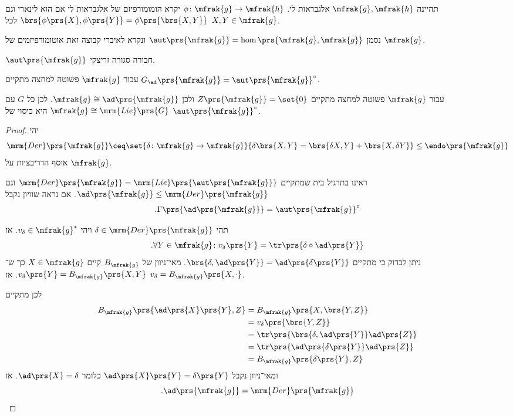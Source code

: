 \documentclass[10pt, twoside]{book}
\newcommand{\Lie}{\mrm{Lie}}
\begin{document}
\begin{definition}
תהיינה
$\mfrak{g}, \mfrak{h}$
אלגבראות לי.
$\phi \colon \mfrak{g} \to \mfrak{h}$
יקרא הומומורפיזם של אלגבראות לי אם הוא לינארי וגם
$\brs{\phi\prs{X}, \phi\prs{Y}} = \phi\prs{\brs{X,Y}}$
לכל
$X,Y \in \mfrak{g}$.
\end{definition}

\begin{notation}
נסמן
$\aut\prs{\mfrak{g}} = \hom\prs{\mfrak{g}, \mfrak{g}}$
ונקרא לאיברי קבוצה זאת אוטומורפיזמים של
$\mfrak{g}$.
\end{notation}

\begin{remark}
$\aut\prs{\mfrak{g}}$
חבורה סגורה זריצקי.
\end{remark}

\begin{proposition}
עבור
$\mfrak{g}$
פשוטה למחצה מתקיים
$G_{\ad}\prs{\mfrak{g}} = \aut\prs{\mfrak{g}}^\circ$.
\end{proposition}

\begin{corollary}
עבור
$\mfrak{g}$
פשוטה למחצה מתקיים
$Z\prs{\mfrak{g}} = \set{0}$
ולכן
$\mfrak{g} \cong \ad\prs{\mfrak{g}}$.
לכן כל
$G$
עם
$\mfrak{g} \cong \Lie\prs{G}$
היא כיסוי של
$\aut\prs{\mfrak{g}}^\circ$.
\end{corollary}

\begin{proof}
יהי
\[\mrm{Der}\prs{\mfrak{g}} \ceq \set{\delta \colon \mfrak{g} \to \mfrak{g}}{\delta\brs{X,Y} = \brs{\delta X, Y} + \brs{X, \delta Y}} \leq \endo\prs{\mfrak{g}}\]
אוסף הדריבציות על
$\mfrak{g}$.

ראינו בתרגיל בית שמתקיים
$\mrm{Der}\prs{\mfrak{g}} = \Lie\prs{\aut\prs{\mfrak{g}}}$
וגם
$\ad\prs{\mfrak{g}} \leq \mrm{Der}\prs{\mfrak{g}}$.
אם נראה שוויון נקבל
\[\text{.} \Gamma\prs{\ad\prs{\mfrak{g}}} = \aut\prs{\mfrak{g}}^\circ\]

תהי
$\delta \in \mrm{Der}\prs{\mfrak{g}}$
ויהי
$v_{\delta} \in \mfrak{g}^*$.
אז
\[\text{.} \forall Y \in \mfrak{g} \colon v_\delta\prs{Y} = \tr\prs{\delta \circ \ad\prs{Y}}\]
ניתן לבדוק כי מתקיים
$\brs{\delta, \ad\prs{Y}} = \ad\prs{\delta\prs{Y}}$.
מאי־ניוון של
$B_{\mfrak{g}}$
קיים
$X \in \mfrak{g}$
כך ש־%
$v_{\delta}\prs{Y} = B_{\mfrak{g}}\prs{X,Y}$.
אז
$v_\delta = B_{\mfrak{g}}\prs{X, \cdot}$.

לכן מתקיים
\begin{align*}
B_{\mfrak{g}}\prs{\ad\prs{X}\prs{Y},Z} &= B_{\mfrak{g}}\prs{X, \brs{Y,Z}}
\\&= v_{\delta} \prs{\brs{Y,Z}}
\\&= \tr\prs{\brs{\delta, \ad\prs{Y}} \ad\prs{Z}}
\\&= \tr\prs{\ad\prs{\delta\prs{Y}} \ad\prs{Z}}
\\&= B_{\mfrak{g}}\prs{\delta\prs{Y}, Z}
\end{align*}
ומאי־ניוון נקבל
$\ad\prs{X}\prs{Y} = \delta\prs{Y}$
כלומר
$\ad\prs{X} = \delta$.
אז
\[\text{.} \ad\prs{\mfrak{g}} = \mrm{Der}\prs{\mfrak{g}}\]
\end{proof}
\end{document}
